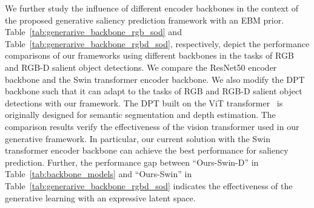 \documentclass{article}
\begin{document}
We further study the influence of different encoder backbones in the context of the proposed generative saliency prediction framework with an EBM prior. Table~\ref{tab:generarive_backbone_rgb_sod} and Table~\ref{tab:generarive_backbone_rgbd_sod}, respectively, depict the performance comparisons of our frameworks using different backbones in the tasks of RGB and RGB-D salient object detections. We compare the ResNet50 encoder backbone and the Swin transformer encoder backbone. We also modify the DPT~\cite{dpt_transformer} backbone such that it can adapt to the tasks of RGB and RGB-D salient object detections with our framework. The DPT built on the ViT transformer~\cite{dosovitskiy_ViT_ICLR_2021} is originally designed for semantic segmentation and depth estimation. The comparison results verify the effectiveness of the vision transformer used in our generative framework. In particular, our current solution with the Swin transformer encoder backbone can achieve the best performance for saliency prediction. Further, the performance gap between ``Ours-Swin-D'' in Table~\ref{tab:backbone_models} and ``Ours-Swin'' in Table~\ref{tab:generarive_backbone_rgbd_sod} indicates the effectiveness of the generative learning with an expressive latent space.
\end{document}
